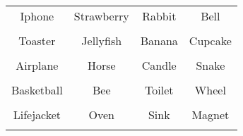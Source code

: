 \documentclass[12pt,a4paper]{article}
\begin{document}
\thispagestyle{empty}
\begin{table}[]
\centering
\Huge
\begin{tabular}{cccc}
 Iphone& Strawberry& Rabbit& Bell\\  & & & \\
 Toaster& Jellyfish& Banana& Cupcake\\  & & & \\
 Airplane& Horse& Candle& Snake\\  & & & \\
 Basketball& Bee& Toilet& Wheel\\  & & & \\
 Lifejacket& Oven& Sink& Magnet\\  & & & \\
\end{tabular}
\end{table}
\end{document}
